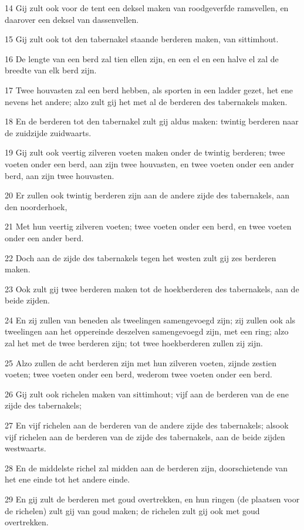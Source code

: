 \par 14 Gij zult ook voor de tent een deksel maken van roodgeverfde ramsvellen, en daarover een deksel van dassenvellen.
\par 15 Gij zult ook tot den tabernakel staande berderen maken, van sittimhout.
\par 16 De lengte van een berd zal tien ellen zijn, en een el en een halve el zal de breedte van elk berd zijn.
\par 17 Twee houvasten zal een berd hebben, als sporten in een ladder gezet, het ene nevens het andere; alzo zult gij het met al de berderen des tabernakels maken.
\par 18 En de berderen tot den tabernakel zult gij aldus maken: twintig berderen naar de zuidzijde zuidwaarts.
\par 19 Gij zult ook veertig zilveren voeten maken onder de twintig berderen; twee voeten onder een berd, aan zijn twee houvasten, en twee voeten onder een ander berd, aan zijn twee houvasten.
\par 20 Er zullen ook twintig berderen zijn aan de andere zijde des tabernakels, aan den noorderhoek,
\par 21 Met hun veertig zilveren voeten; twee voeten onder een berd, en twee voeten onder een ander berd.
\par 22 Doch aan de zijde des tabernakels tegen het westen zult gij zes berderen maken.
\par 23 Ook zult gij twee berderen maken tot de hoekberderen des tabernakels, aan de beide zijden.
\par 24 En zij zullen van beneden als tweelingen samengevoegd zijn; zij zullen ook als tweelingen aan het oppereinde deszelven samengevoegd zijn, met een ring; alzo zal het met de twee berderen zijn; tot twee hoekberderen zullen zij zijn.
\par 25 Alzo zullen de acht berderen zijn met hun zilveren voeten, zijnde zestien voeten; twee voeten onder een berd, wederom twee voeten onder een berd.
\par 26 Gij zult ook richelen maken van sittimhout; vijf aan de berderen van de ene zijde des tabernakels;
\par 27 En vijf richelen aan de berderen van de andere zijde des tabernakels; alsook vijf richelen aan de berderen van de zijde des tabernakels, aan de beide zijden westwaarts.
\par 28 En de middelste richel zal midden aan de berderen zijn, doorschietende van het ene einde tot het andere einde.
\par 29 En gij zult de berderen met goud overtrekken, en hun ringen (de plaatsen voor de richelen) zult gij van goud maken; de richelen zult gij ook met goud overtrekken.
